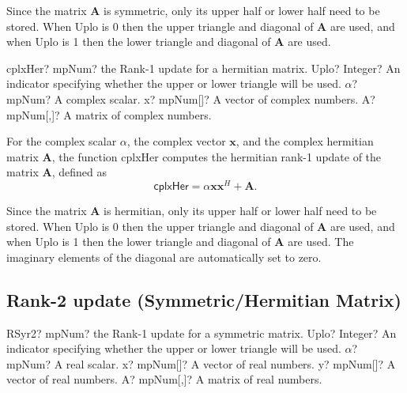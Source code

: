 Since the matrix $\boldsymbol{A}$ is symmetric, only its upper half or lower half need to be stored. When \textsf{Uplo} is 0 then the upper triangle and diagonal of $\boldsymbol{A}$ are used, and when \textsf{Uplo} is 1 then the lower triangle and diagonal of $\boldsymbol{A}$ are used. 



\vspace{0.6cm}
\begin{mpFunctionsExtract}
	\mpFunctionFour
	{cplxHer? mpNum? the Rank-1 update for a hermitian matrix.}
	{Uplo? Integer? An indicator specifying whether the upper or lower triangle will be used.}
	{$\alpha$? mpNum? A complex scalar.}
	{x? mpNum[]? A vector of complex numbers.}
	{A? mpNum[,]? A matrix of complex numbers.}
\end{mpFunctionsExtract}

\vspace{0.3cm}
For the complex scalar $\alpha$, the complex vector $\boldsymbol{x}$, and the complex hermitian matrix $\boldsymbol{A}$, the function \textsf{cplxHer} computes the hermitian rank-1 update of the matrix $\boldsymbol{A}$, defined as
\begin{equation}
\textsf{cplxHer}= \alpha \boldsymbol{x}  \boldsymbol{x}^H +\boldsymbol{A} .
\end{equation}

Since the matrix $\boldsymbol{A}$ is hermitian, only its upper half or lower half need to be stored. When \textsf{Uplo} is 0 then the upper triangle and diagonal of $\boldsymbol{A}$ are used, and when \textsf{Uplo} is 1 then the lower triangle and diagonal of $\boldsymbol{A}$ are used. 
The imaginary elements of the diagonal are automatically set to zero. 








\newpage
\subsection{Rank-2 update (Symmetric/Hermitian Matrix)}


\begin{mpFunctionsExtract}
	\mpFunctionFive
	{RSyr2? mpNum? the Rank-1 update for a symmetric matrix.}
	{Uplo? Integer? An indicator specifying whether the upper or lower triangle will be used.}
	{$\alpha$? mpNum? A real scalar.}
	{x? mpNum[]? A vector of real numbers.}
	{y? mpNum[]? A vector of real numbers.}
	{A? mpNum[,]? A matrix of real numbers.}
\end{mpFunctionsExtract}

